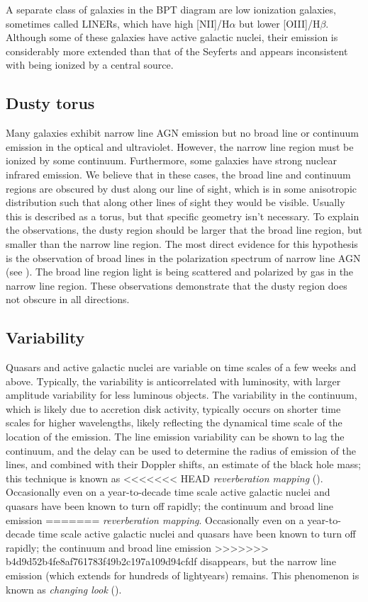 A separate class of galaxies in the BPT diagram are low ionization
galaxies, sometimes called LINERs, which have high [NII]/H$\alpha$ but
lower [OIII]/H$\beta$. Although some of these galaxies have active
galactic nuclei, their emission is considerably more extended than
that of the Seyferts and appears inconsistent with being ionized by a
central source. 

\subsection{Dusty torus}

Many galaxies exhibit narrow line AGN emission but no broad line or
continuum emission in the optical and ultraviolet. However, the narrow
line region must be ionized by some continuum. Furthermore, some
galaxies have strong nuclear infrared emission. We believe that in
these cases, the broad line and continuum regions are obscured by dust
along our line of sight, which is in some anisotropic distribution
such that along other lines of sight they would be visible. Usually
this is described as a torus, but that specific geometry isn't
necessary. To explain the observations, the dusty region should be
larger that the broad line region, but smaller than the narrow line
region. The most direct evidence for this hypothesis is the
observation of broad lines in the polarization spectrum of narrow line
AGN (see \citealt{antonucci93a}). The broad line region light is being
scattered and polarized by gas in the narrow line region. These
observations demonstrate that the dusty region does not obscure in all
directions.

\subsection{Variability}

Quasars and active galactic nuclei are variable on time scales of a
few weeks and above. Typically, the variability is anticorrelated with
luminosity, with larger amplitude variability for less luminous
objects. The variability in the continuum, which is likely due to
accretion disk activity, typically occurs on shorter time scales for
higher wavelengths, likely reflecting the dynamical time scale of the
location of the emission.  The line emission variability can be shown
to lag the continuum, and the delay can be used to determine the
radius of emission of the lines, and combined with their Doppler
shifts, an estimate of the black hole mass; this technique is known as
<<<<<<< HEAD
{\it reverberation mapping} (\citealt{peterson93a}). Occasionally even
on a year-to-decade time scale active galactic nuclei and quasars have
been known to turn off rapidly; the continuum and broad line emission
=======
{\it reverberation mapping}. Occasionally even on a
year-to-decade time scale active galactic nuclei and quasars have been
known to turn off rapidly; the continuum and broad line emission
>>>>>>> b4d9d52b4fe8af761783f49b2c197a109d94cfdf
disappears, but the narrow line emission (which extends for hundreds
of lightyears) remains. This phenomenon is known as {\it changing
look} (\citealt{green22a}).


